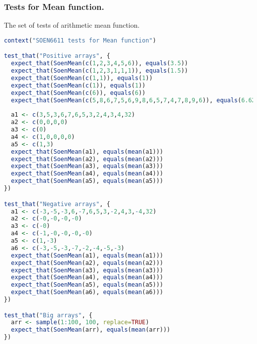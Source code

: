 \documentclass[12pt]{article}
\begin{document}
\subsubsection{Tests for Mean function.}
The set of tests of arithmetic mean function.
\begin{lstlisting}[language=R]
context("SOEN6611 tests for Mean function")

test_that("Positive arrays", {
  expect_that(SoenMean(c(1,2,3,4,5,6)), equals(3.5))
  expect_that(SoenMean(c(1,2,3,1,1,1)), equals(1.5))
  expect_that(SoenMean(c(1,1)), equals(1))
  expect_that(SoenMean(c(1)), equals(1))
  expect_that(SoenMean(c(6)), equals(6))
  expect_that(SoenMean(c(5,8,6,7,5,6,9,8,6,5,7,4,7,8,9,6)), equals(6.625))
  
  a1 <- c(3,5,3,6,7,6,5,3,2,4,3,4,32)
  a2 <- c(0,0,0,0)
  a3 <- c(0)
  a4 <- c(1,0,0,0,0)
  a5 <- c(1,3)
  expect_that(SoenMean(a1), equals(mean(a1)))
  expect_that(SoenMean(a2), equals(mean(a2)))
  expect_that(SoenMean(a3), equals(mean(a3)))
  expect_that(SoenMean(a4), equals(mean(a4)))
  expect_that(SoenMean(a5), equals(mean(a5)))
})

test_that("Negative arrays", {
  a1 <- c(-3,-5,-3,6,-7,6,5,3,-2,4,3,-4,32)
  a2 <- c(-0,-0,-0,-0)
  a3 <- c(-0)
  a4 <- c(-1,-0,-0,-0,-0)
  a5 <- c(1,-3)
  a6 <- c(-3,-5,-3,-7,-2,-4,-5,-3)
  expect_that(SoenMean(a1), equals(mean(a1)))
  expect_that(SoenMean(a2), equals(mean(a2)))
  expect_that(SoenMean(a3), equals(mean(a3)))
  expect_that(SoenMean(a4), equals(mean(a4)))
  expect_that(SoenMean(a5), equals(mean(a5)))
  expect_that(SoenMean(a6), equals(mean(a6)))
})

test_that("Big arrays", {
  arr <- sample(1:100, 100, replace=TRUE)
  expect_that(SoenMean(arr), equals(mean(arr)))
})
\end{lstlisting}
\end{document}
